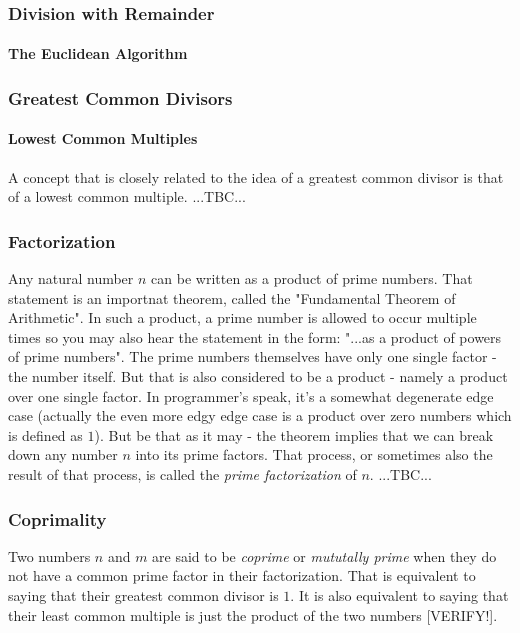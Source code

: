 
\subsubsection{Division with Remainder}


\paragraph{The Euclidean Algorithm}

\subsubsection{Greatest Common Divisors}


\paragraph{Lowest Common Multiples}
A concept that is closely related to the idea of a greatest common divisor is that of a lowest common multiple. ...TBC...

\subsubsection{Factorization}
Any natural number $n$ can be written as a product of prime numbers. That statement is an importnat theorem, called the "Fundamental Theorem of Arithmetic". In such a product, a prime number is allowed to occur multiple times so you may also hear the statement in the form: "...as a product of powers of prime numbers". The prime numbers themselves have only one single factor - the number itself. But that is also considered to be a product - namely a product over one single factor. In programmer's speak, it's a somewhat degenerate edge case (actually the even more edgy edge case is a product over zero numbers which is defined as $1$). But be that as it may - the theorem implies that we can break down any number $n$ into its prime factors. That process, or sometimes also the result of that process, is called the \emph{prime factorization} of $n$. ...TBC...



\subsubsection{Coprimality}
Two numbers $n$ and $m$ are said to be \emph{coprime} or \emph{mututally prime} when they do not have a common prime factor in their factorization. That is equivalent to saying that their greatest common divisor is $1$. It is also equivalent to saying that their least common multiple is just the product of the two numbers [VERIFY!].


